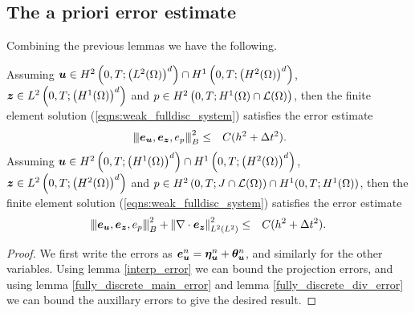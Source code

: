 \subsection{The a priori error estimate}

Combining the previous lemmas we have the following.

\begin{theorem}
\label{error}
Assuming $\boldsymbol{u}  \in H^{2}\left(0,T; \left(L^{2}(\Omega) \right)^{d}\right) \cap H^1\left( 0,T; \left( H^2(\Omega) \right)^d \right)$, $ \boldsymbol{z} \in L^{2}\left(0,T;\left(H^{1}(\Omega) \right)^{d}\right)$ and $ p \in   H^{2}\left(0,T;H^{1}(\Omega)\cap \mathcal{L}(\Omega) \right)$, then the finite element solution (\ref{eqns:weak_fulldisc_system}) satisfies the error estimate
\begin{eqnarray*}{}
\label{full_error}
\left\vert\kern-0.25ex\left\vert\kern-0.25ex\left\vert \boldsymbol{e}_{\boldsymbol{u}},\boldsymbol{e}_{\boldsymbol{z}},{e}_{{p}} \right\vert\kern-0.25ex\right\vert\kern-0.25ex\right\vert_{B}^2  &\leq&  C(h^2 +\Delta t^2 ).
\end{eqnarray*}
Assuming $\boldsymbol{u}  \in H^{2}\left(0,T; \left(H^{1}(\Omega) \right)^{d}\right)  \cap H^1\left( 0,T; \left( H^2(\Omega) \right)^d \right)$, $ \boldsymbol{z} \in L^{2}\left(0,T;\left(H^{2}(\Omega) \right)^{d}\right)$ and $ p \in   H^{2}\left(0,T;J \cap \mathcal{L}(\Omega) \right) \cap H^1(0,T;H^1(\Omega)) $, then the finite element solution (\ref{eqns:weak_fulldisc_system}) satisfies the error estimate
\begin{eqnarray*}
\label{full_div_error}
\left\vert\kern-0.25ex\left\vert\kern-0.25ex\left\vert \boldsymbol{e}_{\boldsymbol{u}},\boldsymbol{e}_{\boldsymbol{z}},{e}_{{p}} \right\vert\kern-0.25ex\right\vert\kern-0.25ex\right\vert_{B}^2 +  {\left\vert\kern-0.25ex\left\vert \nabla\cdot \boldsymbol{e}_{\boldsymbol{z}} \right\vert\kern-0.25ex\right\vert}_{L^{2}(L^{2})}^2    &\leq&  C(h^2 +\Delta t^2 ).
\end{eqnarray*}
\end{theorem}

\begin{proof}
We first write the errors as $\boldsymbol{e}_{\boldsymbol{u}}^n = \boldsymbol{\eta}^{n}_{\boldsymbol{u}} + \boldsymbol{\theta}^{n}_{\boldsymbol{u}}$, and similarly for the other variables. Using lemma \ref{interp_error} we can bound the projection errors, and using lemma \ref{fully_discrete_main_error} and lemma \ref{fully_discrete_div_error} we can bound the auxillary errors to give the desired result.
\end{proof}



